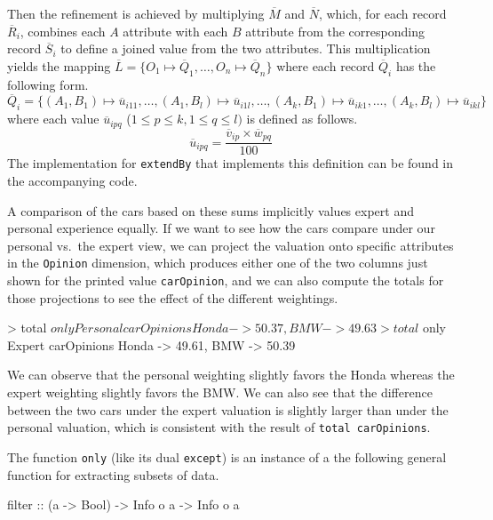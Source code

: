 \documentclass{jfp}
\newcommand{\norm}[1]{\ensuremath{\overline{#1}}}
\newcommand{\nR}{\norm{R}}
\newcommand{\nQ}{\norm{Q}}
\newcommand{\nv}{\norm{v}}
\newcommand{\nw}{\norm{w}}
\newcommand{\prog}[1]{\texttt{#1}}
\begin{document}
Then the refinement is achieved by multiplying \norm{M} and \norm{N}, which, for each record $\nR_i$, combines each $A$ attribute with each $B$ attribute from the corresponding record $\norm{S}_i$ to define a joined value from the two attributes. This multiplication yields the mapping 
%
$\norm{L} = \{O_1 \mapsto \nQ_1, \ldots, O_n \mapsto \nQ_n\}$
%
where each record $\nQ_i$ has the following form. 
%
\[
\nQ_i = \{(A_1,B_1) \mapsto \norm{u}_{i11}, \ldots,
          (A_1,B_l) \mapsto \norm{u}_{i1l}, \ldots,
          (A_k,B_1) \mapsto \norm{u}_{ik1}, \ldots, 
          (A_k,B_l) \mapsto \norm{u}_{ikl}\}
\]
%
where each value $\norm{u}_{ipq}$ ($1 \leq p \leq k,1 \leq q \leq l)$
%
%
is defined as follows.
\[
\norm{u}_{ipq} = \frac{\nv_{ip}\times\nw_{pq}}{100}  
\]
The implementation for \prog{extendBy} that implements this definition can be found in the accompanying code.

A comparison of the cars based on these sums implicitly values expert and personal experience equally. 
%
If we want to see how the cars compare under our personal vs.\ the expert view, we can project the valuation onto specific attributes in the \prog{Opinion} dimension, which produces either one of the two columns just shown for the printed value \prog{carOpinion}, and we can also compute the totals for those projections to see the effect of the different weightings.

\begin{haskellcode}
> total $ only Personal carOpinions
{Honda -> 50.37, BMW -> 49.63}

> total $ only Expert carOpinions 
{Honda -> 49.61, BMW -> 50.39}
\end{haskellcode}

\noindent
%
We can observe that the personal weighting slightly favors the Honda whereas the expert weighting slightly favors the BMW. We can also see that the difference between the two cars under the expert valuation is slightly larger than under the personal valuation, which is consistent with the result of \prog{total carOpinions}.

The function \prog{only} (like its dual \prog{except}) is an instance of a the following general function for extracting subsets of data.

\begin{haskellcode}
filter :: (a -> Bool) -> Info o a -> Info o a
\end{haskellcode}
\end{document}
